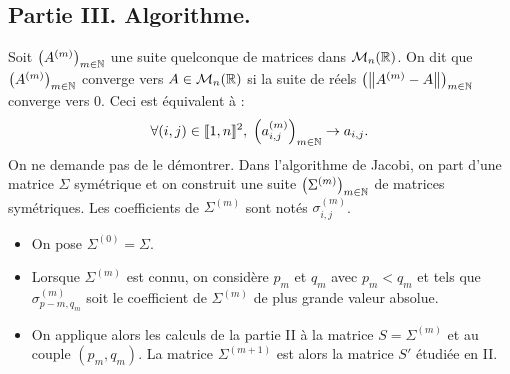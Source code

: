 \subsection*{Partie III. Algorithme.}
Soit $\left( A^{(m)} \right)_{m \in \mathbb{N}}$ une suite quelconque de matrices dans $\mathcal{M}_n(\mathbb{R})$. On dit que $\left( A^{(m)} \right)_{m \in \mathbb{N}}$ converge vers $A \in \mathcal{M}_n(\mathbb{R})$ si la suite de réels $\left( \left\| A^{(m)} -A \right\| \right)_{m \in \mathbb{N}}$ converge vers $0$. Ceci est équivalent à :
\begin{displaymath}
 \forall (i,j)\in \llbracket 1,n \rrbracket^2, \; \left( a_{i,j}^{(m)} \right)_{m \in \mathbb{N}}\rightarrow a_{i,j}.
\end{displaymath}
On ne demande pas de le démontrer.\newline
Dans l'algorithme de Jacobi, on part d'une matrice $\Sigma$ symétrique et on construit une suite $\left( \Sigma^{(m)} \right)_{m \in \mathbb{N}}$ de matrices symétriques. Les coefficients de $\Sigma^{(m)}$ sont notés $\sigma_{i,j}^{(m)}$.
\begin{itemize}
 \item On pose $\Sigma^{(0)} = \Sigma$.
 \item Lorsque $\Sigma^{(m)}$ est connu, on considère $p_m$ et $q_m$ avec $p_m < q_m$ et tels que $\sigma_{p-m, q_m}^{(m)}$ soit le coefficient de $\Sigma^{(m)}$ de plus grande valeur absolue.
 \item On applique alors les calculs de la partie II à la matrice $S = \Sigma^{(m)}$ et au couple $(p_m,q_m)$. La matrice $\Sigma^{(m+1)}$ est alors la matrice $S'$ étudiée en II. 
\end{itemize}

